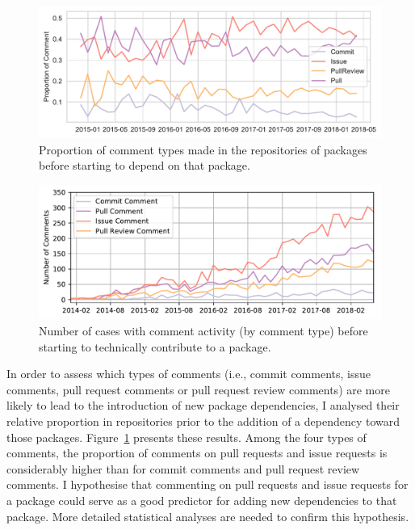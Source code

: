\begin{figure}[!tbh]
    \includegraphics[width=0.9\columnwidth]{Photos/RQ22.pdf} 
\vspace{-0.3cm}
    \caption{Proportion of comment types made in the repositories of packages before starting to depend on that package.}
    \label{fig:fig2}
\end{figure}
\begin{figure}[!tbh]
\vspace{-0.3cm}
    \includegraphics[width=0.9\columnwidth]{Photos/RQ3.pdf} 
\vspace{-0.3cm}
    \caption{Number of cases with comment activity (by comment type) before starting to technically contribute to a package.}
    \label{fig:fig3}
\end{figure}

In order to assess which types of comments (i.e., commit comments, issue comments, pull request comments or pull request review comments) are more likely to lead to the introduction of new package dependencies, I analysed their relative proportion in repositories prior to the addition of a dependency toward those packages. Figure~\ref{fig:fig2} presents these results. 
Among the four types of comments, the proportion of comments on pull requests and issue requests is considerably higher than for commit comments and pull request review comments. I hypothesise that commenting on pull requests and issue requests for a package could serve as a good predictor for adding new dependencies to that package. More detailed statistical analyses are needed to confirm this hypothesis.


